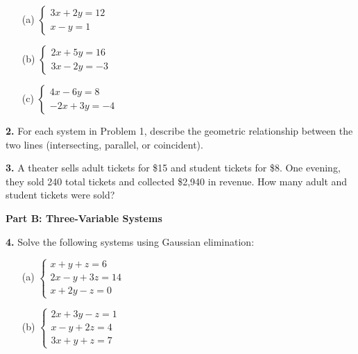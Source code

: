 \documentclass[12pt]{article}
\begin{document}
\begin{enumerate}
\item[(a)] $\begin{cases} 3x + 2y = 12 \\ x - y = 1 \end{cases}$
\vspace{3cm}

\item[(b)] $\begin{cases} 2x + 5y = 16 \\ 3x - 2y = -3 \end{cases}$
\vspace{3cm}

\item[(c)] $\begin{cases} 4x - 6y = 8 \\ -2x + 3y = -4 \end{cases}$
\vspace{3cm}
\end{enumerate}

\textbf{2.} For each system in Problem 1, describe the geometric relationship between the two lines (intersecting, parallel, or coincident).
\vspace{2cm}

\textbf{3.} A theater sells adult tickets for \$15 and student tickets for \$8. One evening, they sold 240 total tickets and collected \$2,940 in revenue. How many adult and student tickets were sold?
\vspace{4cm}

\newpage

\textbf{Part B: Three-Variable Systems}

\textbf{4.} Solve the following systems using Gaussian elimination:

\begin{enumerate}
\item[(a)] $\begin{cases} 
x + y + z = 6 \\
2x - y + 3z = 14 \\
x + 2y - z = 0
\end{cases}$
\vspace{5cm}

\item[(b)] $\begin{cases}
2x + 3y - z = 1 \\
x - y + 2z = 4 \\
3x + y + z = 7
\end{cases}$
\vspace{5cm}
\end{enumerate}
\end{document}
